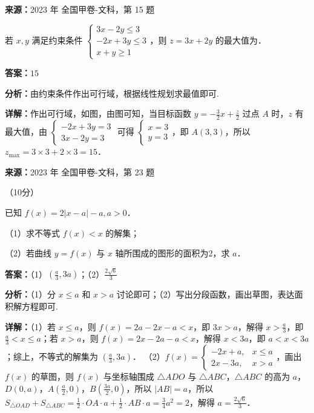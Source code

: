\begin{question}[points=5]
\textbf{来源：}2023 年 全国甲卷-文科，第 15 题\par
若 $x,y$ 满足约束条件 $\begin{cases}3x-2y\le3\\-2x+3y\le3\\x+y\ge1\end{cases}$，则 $z=3x+2y$ 的最大值为．
\fillin[{$15$}]
\begin{solution}
\textbf{答案：}$15$

\textbf{分析：}由约束条件作出可行域，根据线性规划求最值即可.

\textbf{详解：}作出可行域，如图，由图可知，当目标函数 $y=-\frac{3}{2}x+\frac{z}{2}$ 过点 $A$ 时，$z$ 有最大值，由 $\begin{cases}-2x+3y=3\\3x-2y=3\end{cases}$ 可得 $\begin{cases}x=3\\y=3\end{cases}$，即 $A(3,3)$，所以 $z_{\max}=3\times3+2\times3=15$．
\end{solution}
\end{question}

\begin{question}[points=10]
\textbf{来源：}2023 年 全国甲卷-文科，第 23 题\par
[选修4-5：不等式选讲]（10分）

已知 $f(x)=2|x-a|-a, a>0$．

（1）求不等式 $f(x)<x$ 的解集；

（2）若曲线 $y=f(x)$ 与 $x$ 轴所围成的图形的面积为2，求 $a$．
\begin{solution}
\textbf{答案：}（1）$(\frac{a}{3},3a)$；（2）$\frac{2\sqrt{6}}{3}$

\textbf{分析：}（1）分 $x\le a$ 和 $x>a$ 讨论即可；（2）写出分段函数，画出草图，表达面积解方程即可.

\textbf{详解：}（1）若 $x\le a$，则 $f(x)=2a-2x-a<x$，即 $3x>a$，解得 $x>\frac{a}{3}$，即 $\frac{a}{3}<x\le a$；若 $x>a$，则 $f(x)=2x-2a-a<x$，解得 $x<3a$，即 $a<x<3a$；综上，不等式的解集为 $(\frac{a}{3},3a)$．
（2）$f(x)=\begin{cases}-2x+a, & x\le a\\ 2x-3a, & x>a\end{cases}$，画出 $f(x)$ 的草图，则 $f(x)$ 与坐标轴围成 $\triangle ADO$ 与 $\triangle ABC$，$\triangle ABC$ 的高为 $a$，$D(0,a)$，$A(\frac{a}{2},0)$，$B(\frac{3a}{2},0)$，所以 $|AB|=a$，所以 $S_{\triangle OAD}+S_{\triangle ABC}=\frac{1}{2}\cdot OA\cdot a+\frac{1}{2}\cdot AB\cdot a=\frac{3}{4}a^2=2$，解得 $a=\frac{2\sqrt{6}}{3}$．
\end{solution}
\end{question}

